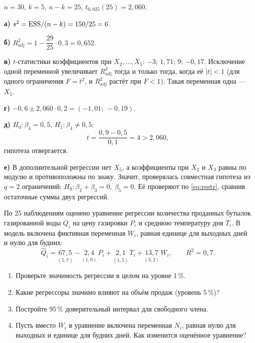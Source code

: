 \begin{solution}
$n = 30$, $k = 5$, $n - k = 25$, $t_{0{,}025}(25) = 2{,}060$.

\medskip
\textbf{а)} $s^2 = \mathrm{ESS}/(n-k) = 150/25 = 6$.

\medskip
\textbf{б)} $R^2_{\text{adj}} = 1 - \dfrac{29}{25}\cdot 0{,}3 = 0{,}652$.

\medskip
\textbf{в)} $t$-статистики коэффициентов при $X_2, \dots, X_5$:
$-3$; $1{,}71$; $9$; $-0{,}17$. Исключение одной переменной увеличивает
$R^2_{\text{adj}}$ тогда и только тогда, когда её $|t| < 1$ (для одного
ограничения $F = t^2$, и $R^2_{\text{adj}}$ растёт при $F < 1$). Такая
переменная одна — $X_5$.

\medskip
\textbf{г)} $-0{,}6 \pm 2{,}060\cdot 0{,}2 = (-1{,}01;\ -0{,}19)$.

\medskip
\textbf{д)} $H_0\colon \beta_4 = 0{,}5$, $H_1\colon \beta_4 \ne 0{,}5$:
\[
  t = \frac{0{,}9 - 0{,}5}{0{,}1} = 4 > 2{,}060 ,
\]
гипотеза отвергается.

\medskip
\textbf{е)} В дополнительной регрессии нет $X_5$, а коэффициенты при $X_2$ и
$X_3$ равны по модулю и противоположны по знаку. Значит, проверялась
совместная гипотеза из $q = 2$ ограничений:
$H_0\colon \beta_2 + \beta_3 = 0,\ \beta_5 = 0$. Её проверяют по
\eqref{eq:restr}, сравнив остаточные суммы двух регрессий.
\end{solution}


По 25 наблюдениям оценено уравнение регрессии количества проданных бутылок
газированной воды $Q_i$ на цену газировки $P_i$ и среднюю температуру дня
$T_i$. В модель включена фиктивная переменная $W_i$, равная единице для
выходных дней и нулю для будних:
\[
  \widehat{Q}_i = \underset{(5{,}7)}{67{,}5} - \underset{(1{,}0)}{2{,}4}\,P_i
  + \underset{(1{,}5)}{2{,}1}\,T_i + \underset{(3{,}2)}{13{,}7}\,W_i,
  \qquad R^2 = 0{,}7 .
\]
\begin{enumerate}[label=\asbuk*), leftmargin=2.2em, itemsep=3pt]
  \item Проверьте значимость регрессии в целом на уровне 1\,\%.
  \item Какие регрессоры значимо влияют на объём продаж (уровень 5\,\%)?
  \item Постройте 95\,\% доверительный интервал для свободного члена.
  \item Пусть вместо $W_i$ в уравнение включена переменная $N_i$, равная нулю
        для выходных и единице для будних дней. Как изменится оценённое
        уравнение?
\end{enumerate}

